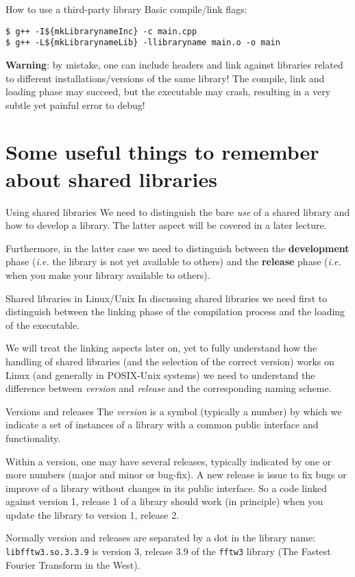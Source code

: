 \documentclass[10pt]{beamer}
\begin{document}
\begin{frame}[fragile]{How to use a third-party library}
  Basic compile/link flags:
\begin{verbatim}
$ g++ -I${mkLibrarynameInc} -c main.cpp
$ g++ -L${mkLibrarynameLib} -llibraryname main.o -o main
\end{verbatim}
\bigskip
\textbf{Warning}: by mistake, one can include headers and link against libraries related to different installations/versions of the same library! The compile, link and loading phase may succeed, but the executable may crash, resulting in a very subtle yet painful error to debug!
\end{frame}

\section{Some useful things to remember about shared libraries}

\begin{frame}{Using shared libraries}
  We need to distinguish the bare \emph{use} of a shared library and how
  to develop a library. The latter aspect will be covered in a later lecture.
  \medskip

  Furthermore, in the latter case we need to distinguish between the
  \textbf{development} phase (\textit{i.e.} the library is not yet available to others) and the \textbf{release} phase (\textit{i.e.} when you make your
  library available to others).
\end{frame}


\begin{frame}{Shared libraries in Linux/Unix} In
  discussing shared libraries we need first to distinguish between the
  linking phase of the compilation process and the loading of the
  executable. 
  \medskip

  We will treat the linking aspects later on, yet to fully understand
  how the handling of shared libraries (and the selection of the correct
  version) works on Linux (and generally in POSIX-Unix systems) we need
  to understand the difference between \emph{version} and \emph{release}
  and the corresponding naming scheme.
\end{frame}

\begin{frame}{Versions and releases} 
  The \emph{version} is a symbol
  (typically a number) by which we indicate a set of instances of a
  library with a common public interface and functionality.
  \smallskip

  Within a version, one may have several releases, typically indicated
  by one or more numbers (major and minor or bug-fix). A new release is 
  issue to fix bugs  or improve of a library without
  changes in its public interface. So a code linked against version 1,
  release 1 of a library should work (in principle) when you update
  the library to version 1, release 2.
  \smallskip

  Normally version and releases are separated by a dot in the library name:
  \texttt{libfftw3.so.3.3.9} is version 3, release 3.9 of the
  \texttt{fftw3} library (The Fastest Fourier Transform in the West).
\end{frame}
\end{document}
